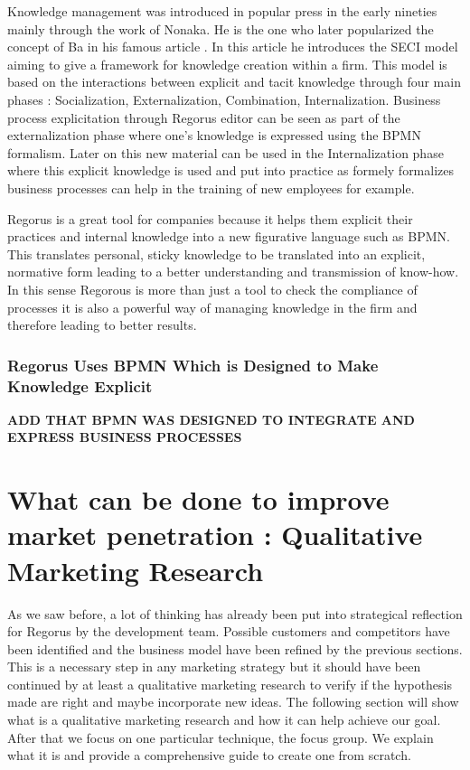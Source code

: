 \documentclass[10pt]{report}
\begin{document}
Knowledge management was introduced in popular press in the early nineties mainly through the work of Nonaka. \autocite{nonaka1991knowledge} He is the one who later popularized the concept of Ba in his famous article \autocite{Nonaka_Konno_1998}. In this article he introduces the SECI model aiming to give a framework for knowledge creation within a firm. This model is based on the interactions between explicit and tacit knowledge through four main phases : Socialization, Externalization, Combination, Internalization. Business process explicitation through Regorus editor can be seen as part of the externalization phase where one's knowledge is expressed using the BPMN formalism. Later on this new material can be used in the Internalization phase where this explicit knowledge is used and put into practice as formely formalizes business processes can help in the training of new employees for example.

Regorus is a great tool for companies because it helps them explicit their practices and internal knowledge into a new figurative language such as BPMN. This translates personal, sticky knowledge to be translated into an explicit, normative form leading to a better understanding and transmission of know-how. In this sense Regorous is more than just a tool to check the compliance of processes it is also a powerful way of managing knowledge in the firm and therefore leading to better results.

\subsubsection{Regorus Uses BPMN Which is Designed to Make Knowledge Explicit}
\textbf{ADD THAT BPMN WAS DESIGNED TO INTEGRATE AND EXPRESS BUSINESS PROCESSES}

\section{What can be done to improve market penetration : Qualitative Marketing Research}

As we saw before, a lot of thinking has already been put into strategical reflection for Regorus by the development team. Possible customers and competitors have been identified and the business model have been refined by the previous sections. This is a necessary step in any marketing strategy but it should have been continued by at least a qualitative marketing research to verify if the hypothesis made are right and maybe incorporate new ideas. The following section will show what is a qualitative marketing research and how it can help achieve our goal. After that we focus on one particular technique, the focus group. We explain what it is and provide a comprehensive guide to create one from scratch.
\end{document}
